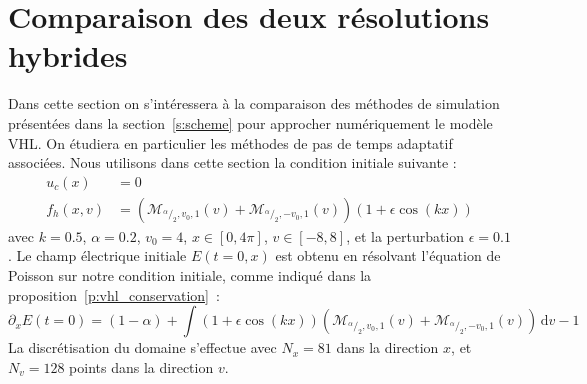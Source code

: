
\section{Comparaison des deux résolutions hybrides}
\label{s:compare}

Dans cette section on s'intéressera à la comparaison des méthodes de simulation présentées dans la section~\ref{s:scheme} pour approcher numériquement le modèle VHL. On étudiera en particulier les méthodes de pas de temps adaptatif associées. Nous utilisons dans cette section la condition initiale suivante :
$$
  \begin{aligned}
    u_c(x)   &= 0 \\
    f_h(x,v) &=  \left(\mathcal{M}_{^\alpha/_2,v_0,1}(v) +  \mathcal{M}_{^\alpha/_2,-v_0,1}(v) \right)(1 + \epsilon\cos(kx))
  \end{aligned}
$$
avec $k=0.5$, $\alpha=0.2$, $v_0 = 4$, $x\in [0,4\pi]$, $v\in[-8,8]$, et la perturbation $\epsilon = 0.1$. Le champ électrique initiale $E(t=0,x)$ est obtenu en résolvant l'équation de Poisson sur notre condition initiale, comme indiqué dans la proposition~\ref{p:vhl_conservation}~:
$$
  \partial_x E(t=0) = (1-\alpha) + \int (1+\epsilon\cos(kx))\left( \mathcal{M}_{^\alpha/_2,v_0,1}(v) + \mathcal{M}_{^\alpha/_2,-v_0,1}(v) \right)\,\mathrm{d}v - 1
$$
La discrétisation du domaine s'effectue avec $N_x=81$ dans la direction $x$, et $N_v=128$ points dans la direction $v$.

